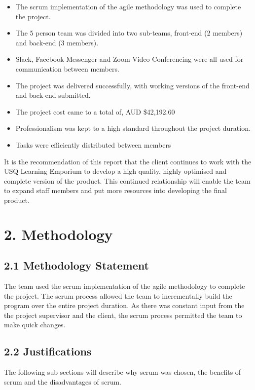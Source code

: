 \documentclass[11pt]{article}
\begin{document}
\begin{itemize}
\item The scrum implementation of the agile methodology was used to complete the project.
\item The 5 person team was divided into two sub-teams, front-end (2 members) and back-end (3 members).
\item Slack, Facebook Messenger and Zoom Video Conferencing were all used for communication between members.
\item The project was delivered successfully, with working versions of the front-end and back-end submitted.
\item The project cost came to a total of, AUD \$42,192.60
\item Professionalism was kept to a high standard throughout the project duration.
\item Tasks were efficiently distributed between members
\end{itemize}

It is the recommendation of this report that the client continues to work with the USQ Learning Emporium to develop a high quality, highly optimised and complete version of the product. This continued relationship will enable the team to expand staff members and put more resources into developing the final product.


\newpage




\section{2. Methodology}

\subsection{2.1 Methodology Statement}
The team used the scrum implementation of the agile methodology to complete the project. The scrum process allowed the team to incrementally build the program over the entire project duration. As there was constant input from the the project supervisor and the client, the scrum process permitted the team to make quick changes.

\subsection{2.2 Justifications}
The following sub sections will describe why scrum was chosen, the benefits of scrum and the disadvantages of scrum.
\end{document}
